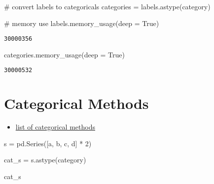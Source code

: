 \documentclass[
  letterpaper,
  DIV=11,
  numbers=noendperiod]{scrreprt}
\newenvironment{Shaded}{\begin{snugshade}}{\end{snugshade}}
\newcommand{\CommentTok}[1]{\textcolor[rgb]{0.37,0.37,0.37}{#1}}
\newcommand{\DecValTok}[1]{\textcolor[rgb]{0.68,0.00,0.00}{#1}}
\newcommand{\NormalTok}[1]{\textcolor[rgb]{0.00,0.23,0.31}{#1}}
\newcommand{\OperatorTok}[1]{\textcolor[rgb]{0.37,0.37,0.37}{#1}}
\newcommand{\StringTok}[1]{\textcolor[rgb]{0.13,0.47,0.30}{#1}}
\newcommand{\VariableTok}[1]{\textcolor[rgb]{0.07,0.07,0.07}{#1}}
\providecommand{\tightlist}{%
  \setlength{\itemsep}{0pt}\setlength{\parskip}{0pt}}\usepackage{longtable,booktabs,array}
\begin{document}
\begin{Shaded}
\begin{Highlighting}[]
\CommentTok{\# convert labels to categoricals}
\NormalTok{categories }\OperatorTok{=}\NormalTok{ labels.astype(}\StringTok{\textquotesingle{}category\textquotesingle{}}\NormalTok{)}
\end{Highlighting}
\end{Shaded}

\begin{Shaded}
\begin{Highlighting}[]
\CommentTok{\# memory use}
\NormalTok{labels.memory\_usage(deep }\OperatorTok{=} \VariableTok{True}\NormalTok{)}
\end{Highlighting}
\end{Shaded}

\begin{verbatim}
30000356
\end{verbatim}

\begin{Shaded}
\begin{Highlighting}[]
\NormalTok{categories.memory\_usage(deep }\OperatorTok{=} \VariableTok{True}\NormalTok{)}
\end{Highlighting}
\end{Shaded}

\begin{verbatim}
30000532
\end{verbatim}

\hypertarget{categorical-methods}{%
\section{Categorical Methods}\label{categorical-methods}}

\begin{itemize}
\tightlist
\item
  \href{https://learning.oreilly.com/library/view/python-for-data/9781098104023/ch07.html\#table_categorical_methods}{list
  of categorical methods}
\end{itemize}

\begin{Shaded}
\begin{Highlighting}[]
\NormalTok{s }\OperatorTok{=}\NormalTok{ pd.Series([}\StringTok{\textquotesingle{}a\textquotesingle{}}\NormalTok{, }\StringTok{\textquotesingle{}b\textquotesingle{}}\NormalTok{, }\StringTok{\textquotesingle{}c\textquotesingle{}}\NormalTok{, }\StringTok{\textquotesingle{}d\textquotesingle{}}\NormalTok{] }\OperatorTok{*} \DecValTok{2}\NormalTok{)}

\NormalTok{cat\_s }\OperatorTok{=}\NormalTok{ s.astype(}\StringTok{\textquotesingle{}category\textquotesingle{}}\NormalTok{)}

\NormalTok{cat\_s}
\end{Highlighting}
\end{Shaded}
\end{document}
